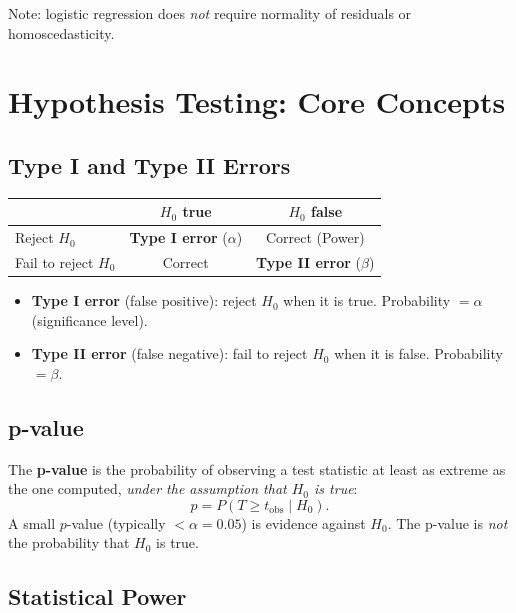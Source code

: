 \documentclass[11pt, a4paper]{article}
\begin{document}
Note: logistic regression does \emph{not} require normality of residuals or homoscedasticity.

\section{Hypothesis Testing: Core Concepts}

\subsection{Type I and Type II Errors}

\begin{center}
\begin{tabular}{lcc}
\toprule
 & $H_0$ true & $H_0$ false \\
\midrule
Reject $H_0$ & \textbf{Type I error} ($\alpha$) & Correct (Power) \\
Fail to reject $H_0$ & Correct & \textbf{Type II error} ($\beta$) \\
\bottomrule
\end{tabular}
\end{center}

\begin{itemize}
  \item \textbf{Type I error} (false positive): reject $H_0$ when it is true. Probability $= \alpha$ (significance level).
  \item \textbf{Type II error} (false negative): fail to reject $H_0$ when it is false. Probability $= \beta$.
\end{itemize}

\subsection{p-value}

The \textbf{p-value} is the probability of observing a test statistic at least as extreme as the one computed, \emph{under the assumption that $H_0$ is true}:
\[
  p = P(T \geq t_{\mathrm{obs}} \mid H_0).
\]
A small $p$-value (typically $< \alpha = 0.05$) is evidence against $H_0$. The p-value is \emph{not} the probability that $H_0$ is true.

\subsection{Statistical Power}
\end{document}
